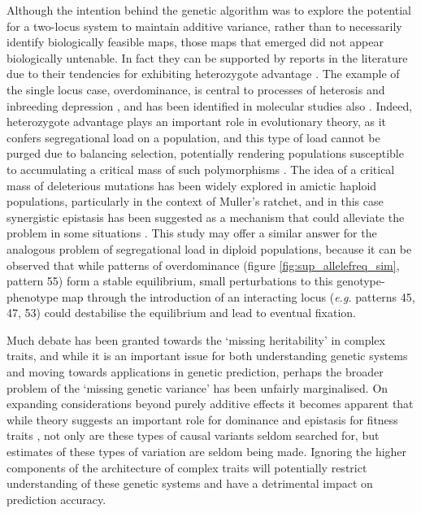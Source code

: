 Although the intention behind the genetic algorithm was to explore the potential for a two-locus system to maintain additive variance, rather than to necessarily identify biologically feasible maps, those maps that emerged did not appear biologically untenable. In fact they can be supported by reports in the literature due to their tendencies for exhibiting heterozygote advantage \citep{Comings2000, Luo2001}. The example of the single locus case, overdominance, is central to processes of heterosis and inbreeding depression \citep{Moll1965, Luo2001}, and has been identified in molecular studies also \citep{Chen1994, Miskimins1986}. Indeed, heterozygote advantage plays an important role in evolutionary theory, as it confers segregational load on a population, and this type of load cannot be purged due to balancing selection, potentially rendering populations susceptible to accumulating a critical mass of such polymorphisms \citep{Dobzhansky1970}. The idea of a critical mass of deleterious mutations has been widely explored in amictic haploid populations, particularly in the context of Muller's ratchet, and in this case synergistic epistasis has been suggested as a mechanism that could alleviate the problem in some situations \citep{Kondrashov1994, Butcher1995}. This study may offer a similar answer for the analogous problem of segregational load in diploid populations, because it can be observed that while patterns of overdominance (figure \ref{fig:sup_allelefreq_sim}, pattern 55) form a stable equilibrium, small perturbations to this genotype-phenotype map through the introduction of an interacting locus (\emph{e.g.} patterns 45, 47, 53) could destabilise the equilibrium and lead to eventual fixation.

Much debate has been granted towards the `missing heritability' in complex traits, and while it is an important issue for both understanding genetic systems and moving towards applications in genetic prediction, perhaps the broader problem of the `missing genetic variance' has been unfairly marginalised. On expanding considerations beyond purely additive effects it becomes apparent that while theory suggests an important role for dominance and epistasis for fitness traits \citep{Waddington1942,Kaneko2009,Siegal2002,Gjuvsland2007,Gao2010,Bergman2003,Lane2010}, not only are these types of causal variants seldom searched for, but estimates of these types of variation are seldom being made. Ignoring the higher components of the architecture of complex traits will potentially restrict understanding of these genetic systems and have a detrimental impact on prediction accuracy.


